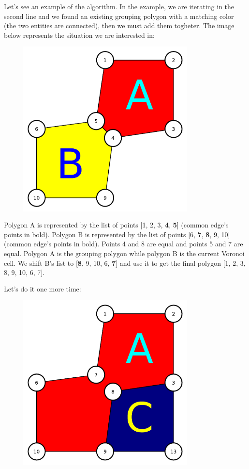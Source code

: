 Let's see an example of the algorithm. In the example, we are iterating in the
second line and we found an existing grouping polygon with a matching color (the
two entities are connected), then we must add them togheter. The image below
represents the situation we are interested in:

\begin{figure}[H]
  \centering
  \includegraphics[width=0.8\textwidth]{assets/polygon-union.pdf}
\end{figure}

Polygon A is represented by the list of points [1, 2, 3, \textbf{4}, \textbf{5}]
(common edge's points in bold). Polygon B is represented by the list of points
[6, \textbf{7}, \textbf{8}, 9, 10] (common edge's points in bold). Points 4 and
8 are equal and points 5 and 7 are equal. Polygon A is the grouping polygon
while polygon B is the current Voronoi cell. We shift B's list to [\textbf{8},
9, 10, 6, \textbf{7}] and use it to get the final polygon [1, 2, 3, 8, 9, 10, 6,
7].

Let's do it one more time:

\begin{figure}[H]
  \centering
  \includegraphics[width=0.8\textwidth]{assets/polygon-union2.pdf}
\end{figure}

